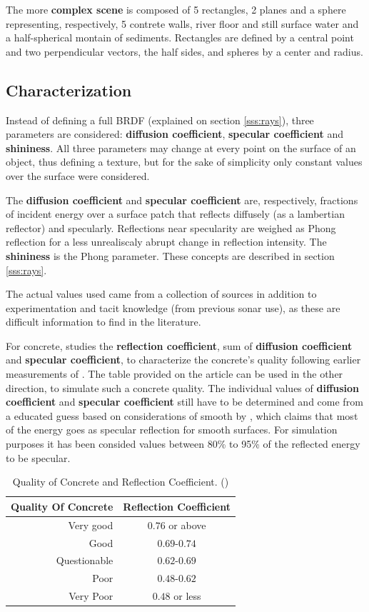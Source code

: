 The more \textbf{complex scene} is composed of 5 rectangles, 2 planes and a sphere
representing, respectively, 5 contrete walls, river floor and still surface
water and a half-spherical montain of sediments. Rectangles are defined by a
central point and two perpendicular vectors, the half sides, and spheres by a
center and radius.

\subsection{Characterization}
\label{ss:characterization}

Instead of defining a full BRDF (explained on section
\ref{sss:rays}), three parameters are considered: \textbf{diffusion coefficient},
\textbf{specular coefficient} and \textbf{shininess}. All three parameters may
change at every point on the surface of an object, thus defining a texture, but
for the sake of simplicity only constant values over the surface were
considered.

The \textbf{diffusion coefficient} and \textbf{specular coefficient} are,
respectively, fractions of incident energy over a surface patch that reflects
diffusely (as a lambertian reflector) and specularly. Reflections near
specularity are weighed as Phong reflection for a less unrealiscaly abrupt
change in reflection intensity. The \textbf{shininess} is the Phong parameter.
These concepts are described in section \ref{sss:rays}.

The actual values used came from a collection of sources in addition to
experimentation and tacit knowledge (from previous sonar use), as these are
difficult information to find in the literature.

For concrete, \citet{chirp} studies the \textbf{reflection coefficient}, sum of
\textbf{diffusion coefficient} and \textbf{specular coefficient}, to
characterize the concrete's quality following earlier measurements of
\citet{leslie1949ultrasonic}. The table provided on the article can be used in
the other direction, to simulate such a concrete quality. The individual values of \textbf{diffusion coefficient} and \textbf{specular coefficient} still
have to be determined and come from a educated guess based on considerations of
smooth by \citet{Etter2013}, which claims that most of the energy goes as
specular reflection for smooth surfaces. For
simulation purposes it has been consided values between 80\% to 95\% of the reflected energy to be specular.

\begin{table}[ht]
\centering
\begin{tabular}{rc}
Quality Of Concrete & Reflection Coefficient \\
\hline
Very good & $0.76$ or above  \\
Good & $0.69$-$0.74$  \\
Questionable & $0.62$-$0.69$  \\
Poor & $0.48$-$0.62$  \\
Very Poor & $0.48$ or less  \\
\end{tabular}
\caption{Quality of Concrete and Reflection Coefficient.
(\citet{chirp,leslie1949ultrasonic})}
\end{table}

